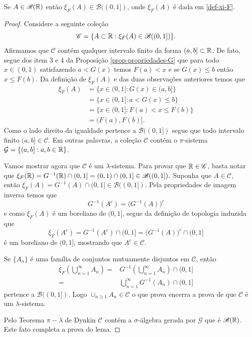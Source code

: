 \begin{lema}
	Se $A\in\mathscr{B}(\mathbb{R})$ então $\xi_F(A) \in\mathscr{B}((0,1])$, onde
	$\xi_F(A)$ é dada em \eqref{def-xi-F}.
\end{lema}



\begin{proof}
Considere a seguinte coleção 
	\[
		\mathscr{C} 
		=
		\{ A\subset\mathbb{R}: \xi_F(A) \in \mathscr{B}((0,1])\}.
	\]
Afirmamos que $\mathscr{C}$ contém qualquer intervalo finito da forma
$(a,b]\subset \mathbb{R}$. De fato, segue dos item 3 e 4 
da Proposição \ref{prop-propriedades-G} que 
para todo $x\in (0,1)$ satisfazendo 
$a<G(x)$ temos $F(a)<x$ e se $G(x)\leq b$ então 
$x\leq F(b)$. Da definição de $\xi_{F}(A)$ e 
das duas observações anteriores temos que
%
%
\begin{align*}
	\xi_F(A) 
	&= 
	\{ x\in (0,1]: G(x) \in (a,b] \}
	\\
	&=	
	\{ x\in (0,1]: a<G(x)\leq b  \}
	\\
	&=
	\{ x\in (0,1]:F(a) <x \leq F(b) \}
	\\
	&=
	(F(a),F(b)].
\end{align*}
Como o lado direito da igualdade pertence a $\mathscr{B}((0,1])$
segue que todo intervalo finito $(a,b]\in \mathscr{C}$.
Em outras palavras, a coleção $\mathscr{C}$ 
contém o $\pi$-sistema $\mathcal{G}=\{ (a,b]: a,b\in\mathbb{R}\}$.


Vamos mostrar agora que $\mathscr{C}$ é um $\lambda$-sistema. 
Para provar que $\mathbb{R}\in \mathscr{C}$, basta 
notar que
$
	\xi_F(\mathbb{R})
	= G^{-1}(\mathbb{R})\cap (0,1] 
	= (0,1)\cap (0,1]
	\in \mathscr{B}((0,1]). 
$
Suponha que $A\in\mathscr{C}$, então 
$\xi_F(A)=G^{-1}(A)\cap (0,1]\in \mathscr{B}((0,1])$.
Pela propriedades de imagem inversa temos que 
\[
	G^{-1}(A^c)= \Big(G^{-1}(A)\Big)^c
\]
e como $\xi_F(A)$ é um boreliano de $(0,1]$, segue da definição 
de topologia induzida que 
	\[
		\xi_F(A^c)
		=
		G^{-1}(A^c)\cap (0,1]
		= 
		\Big(G^{-1}(A)\Big)^c\cap (0,1]		
	\]
é um boreliano de $(0,1]$, mostrando que $A^c\in\mathscr{C}$.

Se $\{A_n\}$ é uma família de 
conjuntos mutuamente disjuntos em $\mathscr{C}$,
então 
	\begin{align*}
	\xi_F\left( \bigcup_{n=1}^{\infty} A_n\right)
	=&
	G^{-1}\left( \bigcup_{n=1}^{\infty} A_n\right)\cap (0,1]
	\\
	=&
	\bigcup_{n=1}^{\infty} G^{-1}\left(A_n \right)\cap (0,1]
	\end{align*}
pertence a $\mathscr{B}((0,1])$. Logo $\cup_{n\geq 1} A_n\in \mathscr{C}$
o que prova encerra a prova de que $\mathscr{C}$ é um $\lambda$-sistema.

Pelo Teorema $\pi-\lambda$ de Dynkin $\mathscr{C}$ contém a $\sigma$-álgebra
gerada por $\mathcal{G}$ que é $\mathscr{B}(\mathbb{R})$. Este fato 
completa a prova do lema.
\end{proof}
















